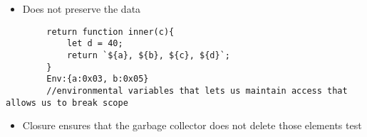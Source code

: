 \documentclass{article}
\begin{document}
\begin{itemize}
\begin{itemize}
        \begin{itemize}
            \item Does not preserve the data
        \end{itemize}
    \end{itemize}
    \begin{lstlisting}
        return function inner(c){
            let d = 40;
            return `${a}, ${b}, ${c}, ${d}`;
        }
        Env:{a:0x03, b:0x05}
        //environmental variables that lets us maintain access that allows us to break scope
    \end{lstlisting}
    \begin{itemize}
        \item Closure ensures that the garbage collector does not delete those elements test
    \end{itemize}
\end{itemize}
\end{document}
